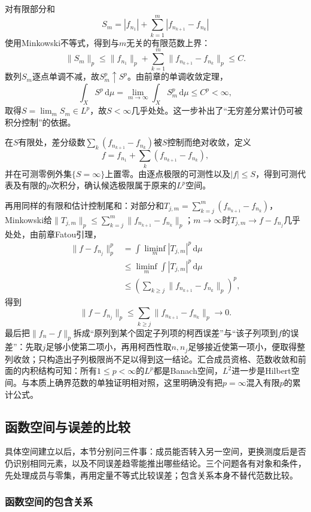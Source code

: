 对有限部分和
\[
  S_m=|f_{n_1}|+\sum_{k=1}^{m}|f_{n_{k+1}}-f_{n_k}|
\]
使用Minkowski不等式，得到与$m$无关的有限范数上界：
\[
  \|S_m\|_p\le\|f_{n_1}\|_p+\sum_{k=1}^m\|f_{n_{k+1}}-f_{n_k}\|_p\le C.
\]
数列$S_m$逐点单调不减，故$S_m^p\uparrow S^p$。由前章的单调收敛定理，
\[
  \int_XS^p\,\mathrm d\mu=\lim_{m\to\infty}\int_XS_m^p\,\mathrm d\mu\le C^p<\infty,
\]
取得$S=\lim_mS_m\in L^p$，故$S<\infty$几乎处处。这一步补出了“无穷差分累计仍可被积分控制”的依据。

在$S$有限处，差分级数$\sum_k(f_{n_{k+1}}-f_{n_k})$被$S$控制而绝对收敛，定义
\[
  f=f_{n_1}+\sum_k(f_{n_{k+1}}-f_{n_k}),
\]
并在可测零例外集$\{S=\infty\}$上置零。由逐点极限的可测性以及$|f|\le S$，得到可测代表及有限的$p$次积分，确认候选极限属于原来的$L^p$空间。

再用同样的有限和估计控制尾和：对部分和$T_{j,m}=\sum_{k=j}^m(f_{n_{k+1}}-f_{n_k})$，Minkowski给$\|T_{j,m}\|_p\le\sum_{k=j}^m\|f_{n_{k+1}}-f_{n_k}\|_p$；$m\to\infty$时$T_{j,m}\to f-f_{n_j}$几乎处处，由前章Fatou引理，
\[
\begin{aligned}
  \|f-f_{n_j}\|_p^p
  &=\int\liminf_m|T_{j,m}|^p\,\mathrm d\mu\\
  &\le\liminf_m\int|T_{j,m}|^p\,\mathrm d\mu\\
  &\le\left(\sum_{k\ge j}\|f_{n_{k+1}}-f_{n_k}\|_p\right)^p,
\end{aligned}
\]
得到
\[
  \|f-f_{n_j}\|_p\le\sum_{k\ge j}\|f_{n_{k+1}}-f_{n_k}\|_p\to0.
\]
最后把$\|f_n-f\|_p$拆成“原列到某个固定子列项的柯西误差”与“该子列项到$f$的误差”：先取$j$足够小使第二项小，再用柯西性取$n,n_j$足够接近使第一项小，便取得整列收敛；只构造出子列极限尚不足以得到这一结论。汇合成员资格、范数收敛和前面的内积结构可知：所有$1\le p<\infty$的$L^p$都是Banach空间，$L^2$进一步是Hilbert空间。与本质上确界范数的单独证明相对照，这里明确没有把$p=\infty$混入有限$p$的累计公式。

\subsection{函数空间与误差的比较}
\label{subsec:comparing-spaces-errors}

具体空间建立以后，本节分别问三件事：成员能否转入另一空间，更换测度后是否仍识别相同元素，以及不同误差趋零能推出哪些结论。三个问题各有对象和条件，先处理成员与零集，再用定量不等式比较误差；包含关系本身不替代范数比较。

\subsubsection{函数空间的包含关系}
\label{subsubsec:inclusion-relations}

